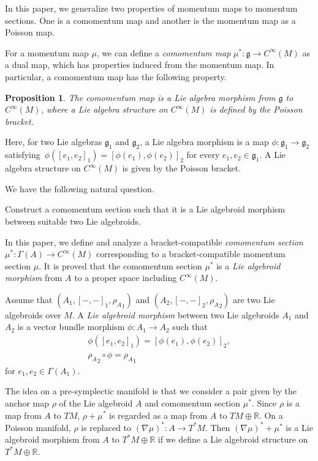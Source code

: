 \documentclass[pdftex]{sigma}
\numberwithin{equation}{section}
\newtheorem{Proposition}[Theorem]{Proposition}
 { \theoremstyle{definition}
\newtheorem{Definition}[Theorem]{Definition}
\newtheorem{Note}[Theorem]{Note}
\newtheorem{Example}[Theorem]{Example}
\newtheorem{Remark}[Theorem]{Remark}
\newtheorem{Question}[Theorem]{Question}
 }
\def\bR{{\mathbb{R}}}
\newcommand{\rhoa}{{\rho_A}}
\begin{document}
In this paper, we generalize two properties of momentum maps to momentum sections. One is a comomentum map and another is the momentum map as a Poisson map.

For a momentum map $\mu$, we can define a \textit{comomentum map}
$\mu^*\colon \mathfrak{g} \rightarrow C^{\infty}(M)$ as a dual map,
which has properties induced from the momentum map.
In particular, a comomentum map has the following property.

\begin{Proposition}
The comomentum map is a Lie algebra morphism from $\mathfrak{g}$ to $C^{\infty}(M)$, where a Lie algebra structure on $C^{\infty}(M)$ is defined by the Poisson bracket.
\end{Proposition}
Here, for two Lie algebras $\mathfrak{g}_1$ and $\mathfrak{g}_2$,
a Lie algebra morphism is a map $\phi\colon\mathfrak{g}_1 \rightarrow \mathfrak{g}_2$ satisfying~${\phi([e_1, e_2]_1) = [\phi(e_1), \phi(e_2)]_2}$
for every $e_1, e_2 \in \mathfrak{g}_1$.
A Lie algebra structure on $C^{\infty}(M)$ is given by the Poisson bracket.

We have the following natural question.

\begin{Question}
Construct a comomentum section such that it is a Lie algebroid morphism
between suitable two Lie algebroids.
\end{Question}

In this paper, we define and analyze a bracket-compatible \textit{comomentum section} $\mu^*\colon\Gamma(A) \rightarrow C^{\infty}(M)$ corresponding to a bracket-compatible momentum section $\mu$.
It is proved that the comomentum section $\mu^*$ is a \textit{Lie algebroid morphism} from $A$ to a proper space including $C^{\infty}(M)$.

\begin{Definition}
Assume that $(A_1, [-,-]_1, \rhoa_1)$ and $(A_2, [-,-]_2, \rhoa_2)$ are
two Lie algebroids over $M$.
A \textit{Lie algebroid morphism} between two Lie algebroids $A_1$ and $A_2$
is a vector bundle morphism $\phi\colon A_1 \rightarrow A_2$
such that
\begin{gather*}
\phi([e_1, e_2]_1) = [\phi(e_1), \phi(e_2)]_2,\nonumber
\\
\rhoa_2 \circ \phi = \rhoa_1
\end{gather*}
for $e_1, e_2 \in \Gamma(A_1)$.
\end{Definition}

The idea on a pre-symplectic manifold
is that we consider a pair given by the anchor map $\rho$
of the Lie algebroid $A$ and comomentum section $\mu^*$.
Since $\rho$ is a map from $A$ to $TM$,
$\rho + \mu^*$ is regarded as a map from $A$ to $TM \oplus \bR$.
On a Poisson manifold, $\rho$ is replaced to
$(\nabla \mu)^*\colon A \rightarrow T^*M$.
Then $(\nabla \mu)^* + \mu^*$ is a Lie algebroid morphism
from $A$ to $T^*M \oplus \bR$ if we define a Lie algebroid structure on
$T^*M \oplus \bR$.
\end{document}
